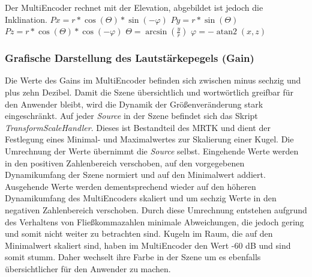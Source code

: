 \documentclass[11pt, titlepage, fleqn]{report}
\DeclareMathOperator{\atantwo}{atan2}
\begin{document}
                    Der MultiEncoder rechnet mit der Elevation, abgebildet ist jedoch die Inklination.\newline\newline
                    \large 
                    $Px=r*\cos(\Theta)*\sin(-\varphi)$ \newline
                    $Py=r*\sin(\Theta)$ \newline
                    $Pz=r*\cos(\Theta)*\cos(-\varphi)$ \newline\newline
                    $\Theta = \arcsin(\frac{y}{r})$\newline
                    $\varphi =-\atantwo(x,z)$\normalsize\newline
                \subsubsection{Grafische Darstellung des Lautstärkepegels (Gain)}
                    Die Werte des Gains im MultiEncoder befinden sich zwischen minus sechzig und plus zehn Dezibel. Damit die Szene 
                    übersichtlich und wortwörtlich greifbar für den Anwender bleibt, wird die Dynamik der Größenveränderung stark eingeschränkt. 
                    Auf jeder \textit{Source} in der Szene befindet sich das 
                    Skript \textit{TransformScaleHandler}. Dieses ist 
                    Bestandteil des 
                    MRTK und dient der Festlegung eines Minimal- und Maximalwertes zur Skalierung einer Kugel. 
                    Die Umrechnung der Werte übernimmt die \textit{Source} selbst. Eingehende Werte werden in den positiven Zahlenbereich verschoben, 
                    auf den vorgegebenen Dynamikumfang der Szene normiert und auf den Minimalwert addiert. Ausgehende Werte werden dementsprechend 
                    wieder auf den höheren Dynamikumfang des MultiEncoders skaliert und um sechzig Werte in den negativen Zahlenbereich verschoben. 
                    Durch diese Umrechnung entstehen aufgrund des Verhaltens von Fließkommazahlen minimale Abweichungen, die jedoch gering und 
                    somit nicht weiter zu betrachten sind.\newline
                    Kugeln im Raum, die auf den Minimalwert skaliert sind, haben im MultiEncoder den Wert -60 dB und sind somit stumm. 
                    Daher wechselt ihre Farbe in der Szene um es ebenfalls übersichtlicher für den Anwender zu machen.
\end{document}
